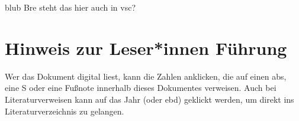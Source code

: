 \maketitle
\clearpage

blub
Bre steht das hier auch in vsc?

\section*{Hinweis zur Leser*innen Führung}
Wer das Dokument digital liest, kann die Zahlen anklicken, die auf einen \gls{abs}, eine \gls{S} oder eine Fußnote innerhalb dieses Dokumentes verweisen. 
Auch bei Literaturverweisen kann auf das Jahr (oder \gls{ebd}) geklickt werden, um direkt ins Literaturverzeichnis zu gelangen. 


\clearpage
\newpage

\tableofcontents %


\printacronyms[type=\acronymtype, 
    nonumberlist, 
    title=Abkürzungsverzeichnis, 
    toctitle=Abkürzungsverzeichnis]{} %

\listoffigures %
\listoftables %

\clearpage
\newpage

\setcounter{page}{1}
